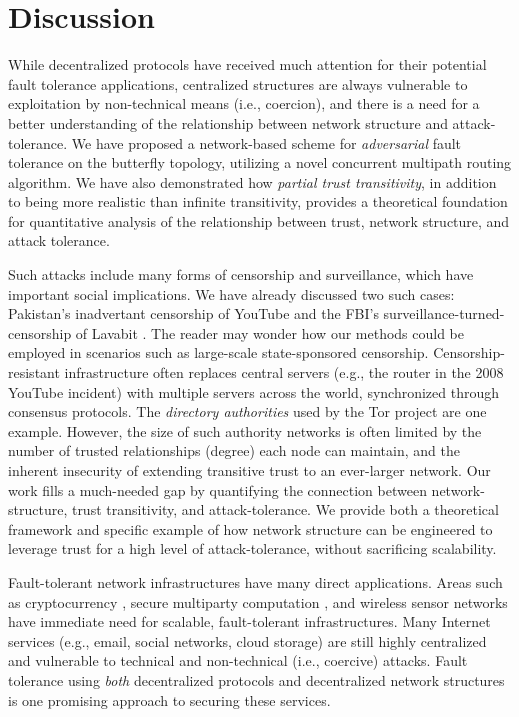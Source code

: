 \documentclass[twocolumn]{article}
\begin{document}
\section{Discussion}
\label{sec-discussion}

While decentralized protocols have received much attention for their potential
fault tolerance applications,
centralized structures are always vulnerable to exploitation by non-technical means (i.e., coercion),
and there is a need for a better understanding of the relationship between network
structure and attack-tolerance.
We have proposed a network-based scheme for {\em adversarial} fault tolerance on the
butterfly topology,
utilizing a novel concurrent multipath routing algorithm.
We have also demonstrated how {\em partial trust transitivity},
in addition to being more realistic than infinite transitivity,
provides a theoretical foundation for
quantitative analysis of the relationship between trust,
network structure, and attack tolerance.

Such attacks include many forms of censorship and surveillance,
which have important social implications.
We have already discussed two such cases:
Pakistan's inadvertant censorship of YouTube
\cite{hunter_pakistan_2008}
and the FBI's surveillance-turned-censorship of Lavabit
\cite{poulsen_edward_2013}.
The reader may wonder how our methods could be employed in scenarios
such as large-scale state-sponsored censorship.
Censorship-resistant infrastructure often replaces central servers
(e.g., the router in the 2008 YouTube incident) with multiple servers across
the world, synchronized through consensus protocols.
The {\em directory authorities} used by the Tor project
\cite{dingledine_tor:_2004} are one example.
However, the size of such authority networks is often limited by the number of
trusted relationships (degree) each node can maintain, and the inherent insecurity of
extending transitive trust to an ever-larger network.
Our work fills a much-needed gap by quantifying the connection between network-structure,
trust transitivity,
and attack-tolerance.
We provide both a theoretical framework and specific example of how network structure
can be engineered to leverage trust for a high level of attack-tolerance,
without sacrificing scalability.

Fault-tolerant network infrastructures have many direct applications.
Areas such as cryptocurrency
\cite{mazieres_stellar_2015,nakamoto_bitcoin:_2008,king_ppcoin:_2012},
secure multiparty computation
\cite{yao_protocols_1982,chaum_multiparty_1988,goldreich_how_1987},
and wireless sensor networks
\cite{khiani_comparative_2013}
have immediate need for scalable, fault-tolerant infrastructures.
Many Internet services (e.g., email, social networks, cloud storage)
are still highly centralized and vulnerable to technical and
non-technical (i.e., coercive) attacks.
Fault tolerance using {\em both}
decentralized protocols and
decentralized network structures
is one promising approach to securing these services.
\end{document}
